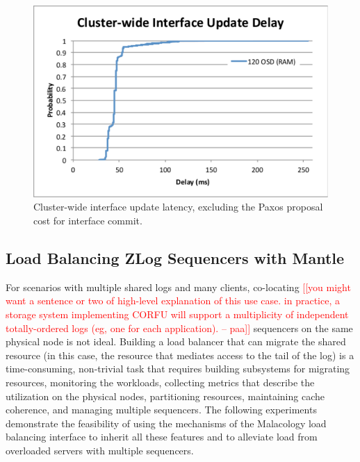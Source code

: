 \documentclass[preprint]{sigplanconf-eurosys}
\newcommand{\paa}[1]{{\textcolor{red}{[[#1 -- paa]]}}}
\begin{document}
\begin{figure}[h]
\centering
\includegraphics[trim={1 4 4 1.3cm},clip]{figures/iface-update-delay.pdf}
\caption{Cluster-wide interface update latency, excluding the Paxos proposal cost for
interface commit.}
\label{fig:propdelay}
\end{figure}

\subsection{Load Balancing ZLog Sequencers with Mantle}

For scenarios with multiple shared logs and many clients, co-locating
\paa{you might want a sentence or two of high-level explanation of this use case.
in practice, a storage system implementing CORFU will support a multiplicity of independent
totally-ordered logs (eg, one for each application).}
sequencers on the same physical node is not ideal. Building a
load balancer that can migrate the shared resource (in this case, the resource
that mediates access to the tail of the log) is a time-consuming, non-trivial task that requires building subsystems
for migrating resources, monitoring the workloads, collecting metrics that
describe the utilization on the physical nodes, partitioning resources,
maintaining cache coherence, and managing multiple sequencers. The following
experiments demonstrate the feasibility of using the mechanisms of the
Malacology load balancing interface to inherit all these features and to
alleviate load from overloaded servers with multiple sequencers.
\end{document}
